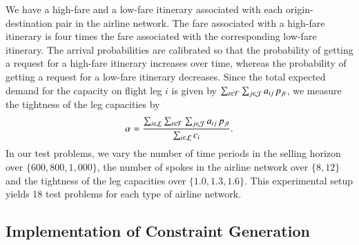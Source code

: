 We have a high-fare and a low-fare itinerary associated with each origin-destination pair in the airline network. The fare associated with a high-fare itinerary is four times the fare associated with the corresponding low-fare itinerary. The arrival probabilities are calibrated so that the probability of getting a request for a high-fare itinerary increases over time, whereas the probability of getting a request for a low-fare itinerary decreases. Since the total expected demand for the capacity on flight leg $i$ is given by $\sum_{t \in {\cal T}} \sum_{j \in {\cal J}} a_{ij} {\,} p_{jt}$, we measure the tightness of the leg capacities by
%
%
\begin{align*}
\alpha
= 
\frac{\sum_{i \in {\cal L}} \sum_{t \in {\cal T}} \sum_{j \in {\cal J}} a_{ij} {\,} p_{jt}}{ \sum_{i \in {\cal L}} c_i}.
\end{align*}
%
%
In our test problems, we vary the number of time periods in the selling horizon over $\{ 600,800,1\!,\!000\}$, the number of spokes in the airline network over $\{8,12\}$ and the tightness of the leg capacities over $\{1.0,1.3,1.6\}$. This experimental setup yields 18 test problems for each type of airline network.


\subsection{Implementation of Constraint Generation}
\label{sec:const}

